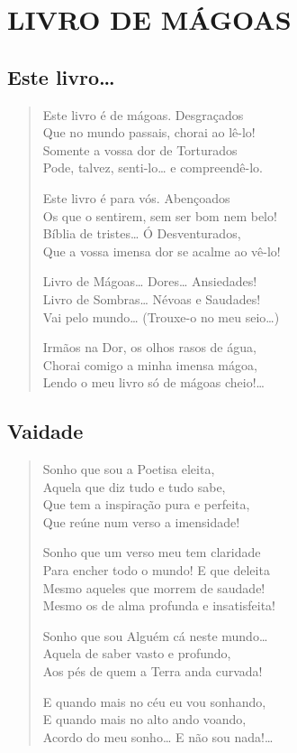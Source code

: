 \part{LIVRO DE MÁGOAS} 

\openany
\chapter{Este livro\ldots{}  }

\begin{verse}
Este livro é de mágoas. Desgraçados\\
Que no mundo passais, chorai ao lê-lo!\\
Somente a vossa dor de Torturados\\
Pode, talvez, senti-lo\ldots{}  e compreendê-lo.

Este livro é para vós. Abençoados\\
Os que o sentirem, sem ser bom nem belo!\\
Bíblia de tristes\ldots{}  Ó Desventurados,\\
Que a vossa imensa dor se acalme ao vê-lo!

Livro de Mágoas\ldots{} 
Dores\ldots{}  Ansiedades!\\
Livro de Sombras\ldots{}  Névoas e Saudades!\\
Vai pelo mundo\ldots{} (Trouxe-o no meu seio\ldots{})

Irmãos na Dor, os olhos rasos de água,\\
Chorai comigo a minha imensa mágoa,\\
Lendo o meu livro só de mágoas cheio!\ldots{}  
\end{verse}

\chapter{Vaidade}

\begin{verse}
Sonho que sou a Poetisa eleita,\\
Aquela que diz tudo e tudo sabe,\\
Que tem a inspiração pura e perfeita,\\
Que reúne num verso a imensidade!

Sonho que um verso meu tem claridade\\
Para encher todo o mundo! E que deleita\\
Mesmo aqueles que morrem de saudade!\\
Mesmo os de alma profunda e insatisfeita!

Sonho que sou Alguém cá neste mundo\ldots{}  \\
Aquela de saber vasto e profundo,\\
Aos pés de quem a Terra anda curvada!

E quando mais no céu eu vou sonhando,\\
E quando mais no alto ando voando,\\
Acordo do meu sonho\ldots{}  E não sou nada!\ldots{}  
\end{verse}

